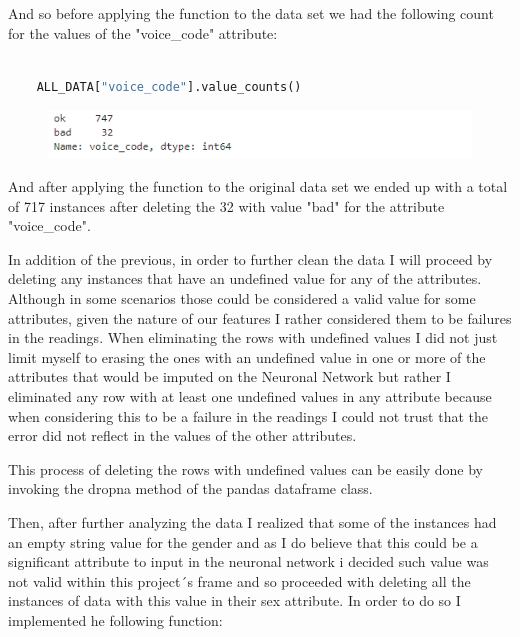 \documentclass[12pt, a4paper]{article}
\begin{document}
	And so before applying the function to the data set we had the following count for the values of the "voice\_code" attribute:
	
	\vspace{5mm}
	
	\begin{lstlisting}[language=Python]
		
	ALL_DATA["voice_code"].value_counts()
	\end{lstlisting}
	
	\begin{figure}[h]
		\includegraphics{img/VoiceCodeBefore.png}
	\end{figure}

	And after applying the function to the original data set we ended up with a total of 717 instances after deleting the 32 with value "bad" for the attribute "voice\_code".
	
	In addition of the previous, in order to further clean the data I will proceed by deleting any instances that have an undefined value for any of the attributes. Although in some scenarios those could be considered a valid value for some attributes, given the nature of our features I rather considered them to be failures in the readings. When eliminating the rows with undefined values I did not just limit myself to erasing the ones with an undefined value in one or more of the attributes that would be imputed on the Neuronal Network but rather I eliminated any row with at least one undefined values in any attribute because when considering this to be a failure in the readings I could not trust that the error did not reflect in the values of the other attributes.
	
	This process of deleting the rows with undefined values can be easily done by invoking the dropna method of the pandas dataframe class.
	
	Then, after further analyzing the data I realized that some of the instances had an empty string value for the gender and as I do believe that this could be a significant attribute to input in the neuronal network i decided such value was not valid within this project´s frame and so proceeded with deleting all the instances of data with this value in their sex attribute. In order to do so I implemented he following function:
	
\end{document}
